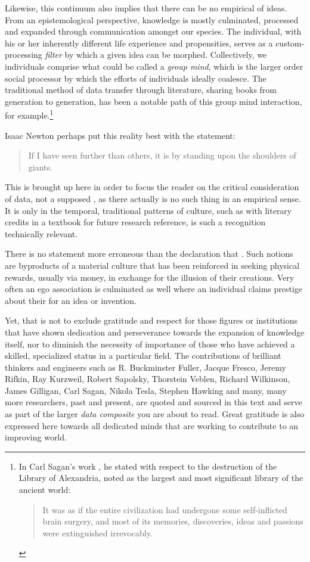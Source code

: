 \documentclass[10pt, a4paper, cleardoubleempty, openright, twoside]{book}
\begin{document}
Likewise, this continuum also implies that there can be no empirical
 of ideas. From an epistemological perspective,
knowledge is mostly culminated, processed and expanded through
communication amongst our species. The individual, with his or her
inherently different life experience and propensities, serves as a
custom-processing \emph{filter} by which a given idea can be morphed.
Collectively, we individuals comprise what could be called a \emph{group
mind}, which is the larger order social processor by which the efforts
of individuals ideally coalesce. The traditional method of data transfer
through literature, sharing books from generation to generation, has
been a notable path of this group mind interaction, for
example.\footnote{
	In Carl Sagan's work , he stated with respect to the
	destruction of the Library of Alexandria, noted as the largest and
	most significant library of the ancient world: \blockcquote[ch.~XIII,
	p.~279]{Sagan::80}{It was as if the entire civilization had undergone
	some self-inflicted brain surgery, and most of its memories,
	discoveries, ideas and passions were extinguished irrevocably.}
}

Isaac Newton perhaps put this reality best with the statement:
\blockcquote[p.~416]{Turnbull::59}{If I have seen further than others,
it is by standing upon the shoulders of giants.} This is brought up here
in order to focus the reader on the critical consideration of data, not
a supposed , as there actually is no such thing in an
empirical sense. It is only in the temporal, traditional patterns of
culture, such as with literary credits in a textbook for future research
reference, is such a recognition technically relevant.

There is no statement more erroneous than the declaration that
. Such notions are byproducts of a material
culture that has been reinforced in seeking physical rewards, usually
via money, in exchange for the illusion of their 
creations. Very often an ego association is culminated as well where an
individual claims prestige about their  for an idea or
invention.

Yet, that is not to exclude gratitude and respect for those figures or
institutions that have shown dedication and perseverance towards the
expansion of knowledge itself, nor to diminish the necessity of
importance of those who have achieved a skilled, specialized
 status in a particular field. The contributions of
brilliant thinkers and engineers such as R. Buckminster Fuller, Jacque
Fresco, Jeremy Rifkin, Ray Kurzweil, Robert Sapolsky, Thorstein Veblen,
Richard Wilkinson, James Gilligan, Carl Sagan, Nikola Tesla, Stephen
Hawking and many, many more researchers, past and present, are quoted
and sourced in this text and serve as part of the larger \emph{data
composite} you are about to read. Great gratitude is also expressed here
towards all dedicated minds that are working to contribute to an
improving world.
\end{document}
